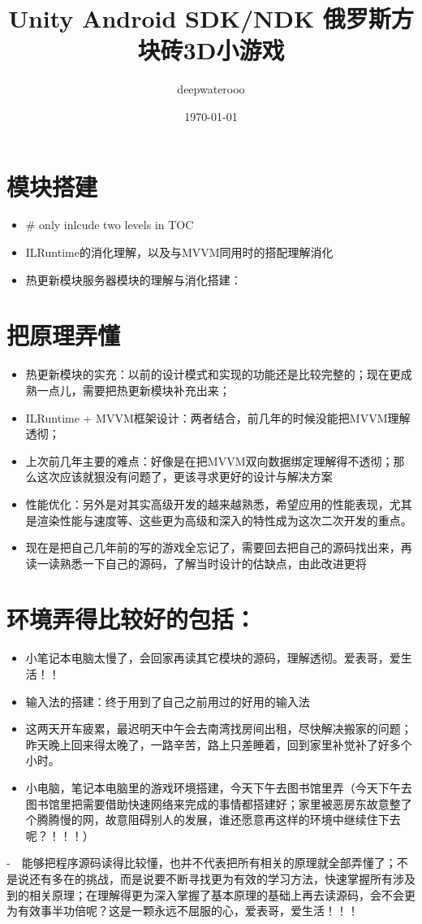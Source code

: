 \documentclass[9pt, b5paper]{article}
\author{deepwaterooo}
\date{\today}
\title{Unity Android SDK/NDK 俄罗斯方块砖3D小游戏}
\begin{document}
\maketitle
\tableofcontents


\section{模块搭建}
\label{sec-1}
\begin{itemize}
\item \# only inlcude two levels in TOC
\item ILRuntime的消化理解，以及与MVVM同用时的搭配理解消化
\item 热更新模块服务器模块的理解与消化搭建：
\end{itemize}

\section{把原理弄懂}
\label{sec-2}
\begin{itemize}
\item 热更新模块的实充：以前的设计模式和实现的功能还是比较完整的；现在更成熟一点儿，需要把热更新模块补充出来；
\item ILRuntime + MVVM框架设计：两者结合，前几年的时候没能把MVVM理解透彻；
\item 上次前几年主要的难点：好像是在把MVVM双向数据绑定理解得不透彻；那么这次应该就狠没有问题了，更该寻求更好的设计与解决方案
\item 性能优化：另外是对其实高级开发的越来越熟悉，希望应用的性能表现，尤其是渲染性能与速度等、这些更为高级和深入的特性成为这次二次开发的重点。

\item 现在是把自己几年前的写的游戏全忘记了，需要回去把自己的源码找出来，再读一读熟悉一下自己的源码，了解当时设计的估缺点，由此改进更将
\end{itemize}

\section{环境弄得比较好的包括：}
\label{sec-3}
\begin{itemize}
\item 小笔记本电脑太慢了，会回家再读其它模块的源码，理解透彻。爱表哥，爱生活！！
\item 输入法的搭建：终于用到了自己之前用过的好用的输入法
\item 这两天开车疲累，最迟明天中午会去南湾找房间出租，尽快解决搬家的问题；昨天晚上回来得太晚了，一路辛苦，路上只差睡着，回到家里补觉补了好多个小时。
\item 小电脑，笔记本电脑里的游戏环境搭建，今天下午去图书馆里弄（今天下午去图书馆里把需要借助快速网络来完成的事情都搭建好；家里被恶房东故意整了个腾腾慢的网，故意阻碍别人的发展，谁还愿意再这样的环境中继续住下去呢？！！！）
\end{itemize}
-　能够把程序源码读得比较懂，也并不代表把所有相关的原理就全部弄懂了；不是说还有多在的挑战，而是说要不断寻找更为有效的学习方法，快速掌握所有涉及到的相关原理；在理解得更为深入掌握了基本原理的基础上再去读源码，会不会更为有效事半功倍呢？这是一颗永远不屈服的心，爱表哥，爱生活！！！
\end{document}
